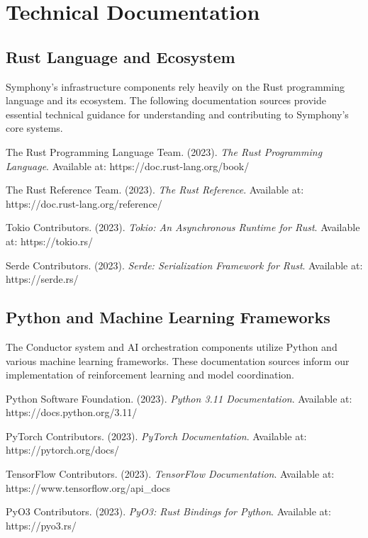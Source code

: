 \section*{Technical Documentation}

\subsection*{Rust Language and Ecosystem}

Symphony's infrastructure components rely heavily on the Rust programming language and its ecosystem. The following documentation sources provide essential technical guidance for understanding and contributing to Symphony's core systems.

\begin{compactlist}
    \item The Rust Programming Language Team. (2023). \textit{The Rust Programming Language}. Available at: https://doc.rust-lang.org/book/
    \item The Rust Reference Team. (2023). \textit{The Rust Reference}. Available at: https://doc.rust-lang.org/reference/
    \item Tokio Contributors. (2023). \textit{Tokio: An Asynchronous Runtime for Rust}. Available at: https://tokio.rs/
    \item Serde Contributors. (2023). \textit{Serde: Serialization Framework for Rust}. Available at: https://serde.rs/
\end{compactlist}

\subsection*{Python and Machine Learning Frameworks}

The Conductor system and AI orchestration components utilize Python and various machine learning frameworks. These documentation sources inform our implementation of reinforcement learning and model coordination.

\begin{compactlist}
    \item Python Software Foundation. (2023). \textit{Python 3.11 Documentation}. Available at: https://docs.python.org/3.11/
    \item PyTorch Contributors. (2023). \textit{PyTorch Documentation}. Available at: https://pytorch.org/docs/
    \item TensorFlow Contributors. (2023). \textit{TensorFlow Documentation}. Available at: https://www.tensorflow.org/api\_docs
    \item PyO3 Contributors. (2023). \textit{PyO3: Rust Bindings for Python}. Available at: https://pyo3.rs/
\end{compactlist}


